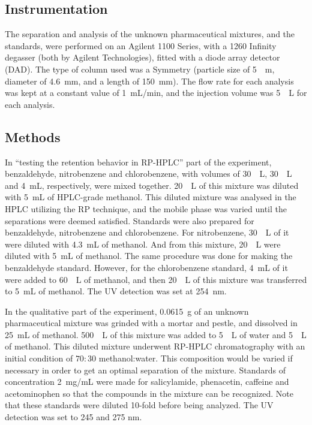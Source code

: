 \documentclass[a4paper, 12pt]{article}
\begin{document}
\subsection{Instrumentation}
The separation and analysis of the unknown pharmaceutical mixtures, and the standards, were performed on an Agilent 1100 Series, with a 1260 Infinity degasser (both by Agilent Technologies), fitted with a diode array detector (DAD). The type of column used was a Symmetry\textregistered{}  (particle size of \SI{5}{\mu{}m}, diameter of \SI{4.6}{mm}, and a length of \SI{150}{mm}). The flow rate for each analysis was kept at a constant value of \SI{1}{mL/min}, and the injection volume was \SI{5}{\mu{}L} for each analysis.

\subsection{Methods}
In ``testing the retention behavior in RP-HPLC'' part of the experiment, benzaldehyde, nitrobenzene and chlorobenzene, with volumes of \SI{30}{\mu{}L}, \SI{30}{\mu{}L} and \SI{4}{mL}, respectively, were mixed together. \SI{20}{\mu{}L} of this mixture was diluted with \SI{5}{mL} of HPLC-grade methanol. This diluted mixture was analysed in the HPLC utilizing the RP technique, and the mobile phase was varied until the separations were deemed satisfied. Standards were also prepared for benzaldehyde, nitrobenzene and chlorobenzene. For nitrobenzene, \SI{30}{\mu{}L} of it were diluted with \SI{4.3}{mL} of methanol. And from this mixture, \SI{20}{\mu{}L} were diluted with \SI{5}{mL} of methanol. The same procedure was done for making the benzaldehyde standard. However, for the chlorobenzene standard, \SI{4}{mL} of it were added to \SI{60}{\mu{}L} of methanol, and then \SI{20}{\mu{}L} of this mixture was transferred to \SI{5}{mL} of methanol. The UV detection was set at \SI{254}{nm}.

In the qualitative part of the experiment, \SI{0.0615}{g} of an unknown pharmaceutical mixture was grinded with a mortar and pestle, and dissolved in \SI{25}{mL} of methanol. \SI{500}{\mu{}L} of this mixture was added to \SI{5}{\mu{}L} of water and \SI{5}{\mu{}L} of methanol. This diluted mixture underwent RP-HPLC chromatography with an initial condition of $70:30$ methanol:water. This composition would be varied if necessary in order to get an optimal separation of the mixture. Standards of concentration \SI{2}{mg/mL} were made for salicylamide, phenacetin, caffeine and acetominophen so that the compounds in the mixture can be recognized. Note that these standards were diluted \num{10}-fold before being analyzed. The UV detection was set to \num{245} and \num{275} \si{nm}.
\end{document}

